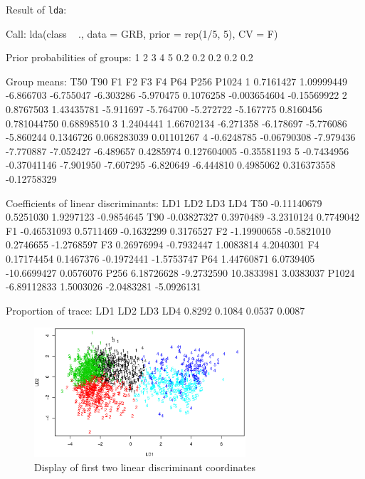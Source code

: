 \documentclass{article}
\begin{document}
\begin{enumerate}[leftmargin = 0 em, label = \arabic*., font = \bfseries]
\begin{enumerate}
	Result of \verb|lda|:
	\begin{rcode}
Call:
lda(class ~ ., data = GRB, prior = rep(1/5, 5), CV = F)

Prior probabilities of groups:
  1   2   3   4   5 
0.2 0.2 0.2 0.2 0.2 

Group means:
         T50         T90        F1        F2        F3        F4       P64         P256       P1024
1  0.7161427  1.09999449 -6.866703 -6.755047 -6.303286 -5.970475 0.1076258 -0.003654604 -0.15569922
2  0.8767503  1.43435781 -5.911697 -5.764700 -5.272722 -5.167775 0.8160456  0.781044750  0.68898510
3  1.2404441  1.66702134 -6.271358 -6.178697 -5.776086 -5.860244 0.1346726  0.068283039  0.01101267
4 -0.6248785 -0.06790308 -7.979436 -7.770887 -7.052427 -6.489657 0.4285974  0.127604005 -0.35581193
5 -0.7434956 -0.37041146 -7.901950 -7.607295 -6.820649 -6.444810 0.4985062  0.316373558 -0.12758329

Coefficients of linear discriminants:
              LD1        LD2         LD3        LD4
T50   -0.11140679  0.5251030   1.9297123 -0.9854645
T90   -0.03827327  0.3970489  -3.2310124  0.7749042
F1    -0.46531093  0.5711469  -0.1632299  0.3176527
F2    -1.19900658 -0.5821010   0.2746655 -1.2768597
F3     0.26976994 -0.7932447   1.0083814  4.2040301
F4     0.17174454  0.1467376  -0.1972441 -1.5753747
P64    1.44760871  6.0739405 -10.6699427  0.0576076
P256   6.18726628 -9.2732590  10.3833981  3.0383037
P1024 -6.89112833  1.5003026  -2.0483281 -5.0926131

Proportion of trace:
   LD1    LD2    LD3    LD4 
0.8292 0.1084 0.0537 0.0087 
	\end{rcode}

	\begin{figure}[!htb]
		\centering
		\includegraphics[width = 0.7\textwidth]{Lda.eps}
		\caption{Display of first two linear discriminant coordinates}
		\label{lda}
	\end{figure}


\end{enumerate}
\end{enumerate}
\end{document}
